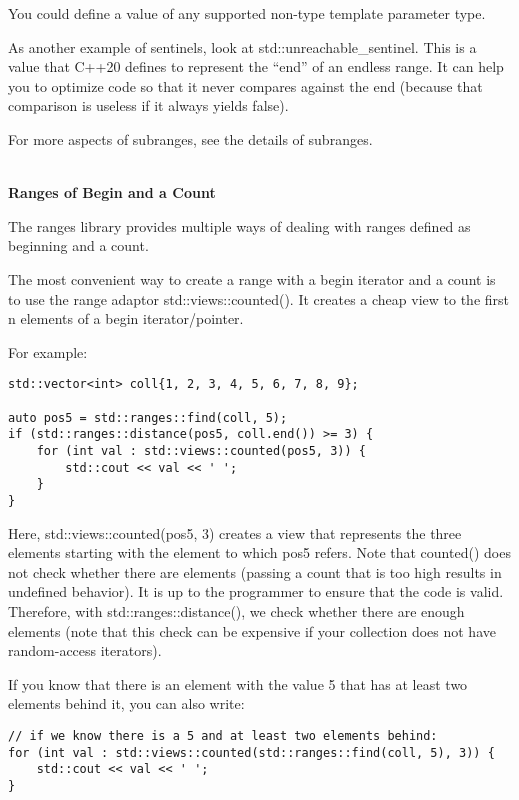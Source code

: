 You could define a value of any supported non-type template parameter type.

As another example of sentinels, look at std::unreachable\_sentinel. This is a value that C++20 defines to represent the “end” of an endless range. It can help you to optimize code so that it never compares against the end (because that comparison is useless if it always yields false).

For more aspects of subranges, see the details of subranges.

\noindent
\hspace*{\fill} \\ %
\textbf{Ranges of Begin and a Count}

The ranges library provides multiple ways of dealing with ranges defined as beginning and a count.

The most convenient way to create a range with a begin iterator and a count is to use the range adaptor std::views::counted(). It creates a cheap view to the first n elements of a begin iterator/pointer.

For example:

\begin{lstlisting}[style=styleCXX]
std::vector<int> coll{1, 2, 3, 4, 5, 6, 7, 8, 9};

auto pos5 = std::ranges::find(coll, 5);
if (std::ranges::distance(pos5, coll.end()) >= 3) {
	for (int val : std::views::counted(pos5, 3)) {
		std::cout << val << ' ';
	}
}
\end{lstlisting}

Here, std::views::counted(pos5, 3) creates a view that represents the three elements starting with the element to which pos5 refers. Note that counted() does not check whether there are elements (passing a count that is too high results in undefined behavior). It is up to the programmer to ensure that the code is valid. Therefore, with std::ranges::distance(), we check whether there are enough elements (note that this check can be expensive if your collection does not have random-access iterators).

If you know that there is an element with the value 5 that has at least two elements behind it, you can also write:

\begin{lstlisting}[style=styleCXX]
// if we know there is a 5 and at least two elements behind:
for (int val : std::views::counted(std::ranges::find(coll, 5), 3)) {
	std::cout << val << ' ';
}
\end{lstlisting}

